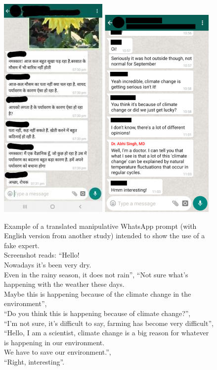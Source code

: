 \documentclass[empirical, authordate]{jote-new-article}
\begin{document}
\begin{figure}

  \centering
  \includegraphics[height=.5\textheight]{media/supplement/images9a.jpeg}
  \includegraphics[height=.5\textheight]{media/supplement/images9b.jpeg}
  \caption{Example of a translated manipulative \mbox{WhatsApp} prompt (with English version from another study) intended to show the use of a fake expert. \\ Screenshot reads: “Hello! \\ Nowadays it's been very dry. \\ Even in the rainy season, it does not rain”, “Not sure what's happening with the weather these days. \\ Maybe this is happening because of the climate change in the environment”,\\ “Do you think this is happening because of climate change?”,\\ “I'm not sure, it's difficult to say, farming has become very difficult”,\\ “Hello, I am a scientist, climate change is a big reason for whatever is happening in our environment. \\ We have to save our environment.”,\\ “Right, interesting”.}
  \label{}
\end{figure}
\end{document}

